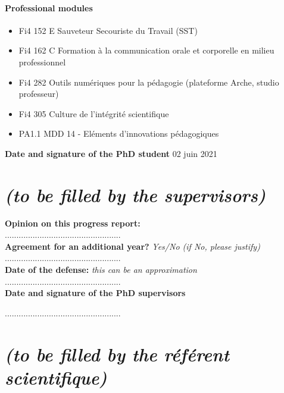 \documentclass[12pt]{article}
\newcommand{\commentaire}[1]{\small\textit{#1}}
\begin{document}
\paragraph{\footnotesize Professional modules}
  \begin{itemize}
      \itemsep0em
      \item Fi4 152 E Sauveteur Secouriste du Travail (SST)
      \item Fi4 162 C Formation à la communication orale et corporelle en milieu professionnel
      \item Fi4 282 Outils numériques pour la pédagogie (plateforme Arche, studio professeur)
      \item Fi4 305 Culture de l’intégrité scientifique
      \item PA1.1 MDD 14 - Eléments d’innovations pédagogiques
  \end{itemize}

\noindent\textbf{Date and signature of the PhD student}
02 juin 2021

\newpage
\section*{ \textit{\small (to be filled by the supervisors)}}

\noindent\textbf{Opinion on this progress report:}\\
..................................................
\\

\noindent\textbf{Agreement for an additional year?}
\commentaire{%
  Yes/No (if No, please justify)\\}
..................................................
\\

\noindent\textbf{Date of the defense:}
\commentaire{%
  this can be an approximation\\}
..................................................
\\


\noindent\textbf{Date and signature of the PhD supervisors}

..................................................

\newpage
\section*{ \textit{\small (to be filled by the ré\-fé\-rent scientifique)}}
\end{document}
